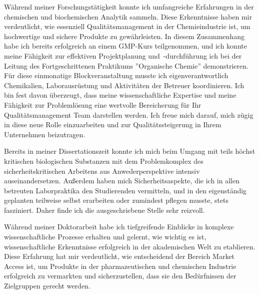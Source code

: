     {Während meiner Forschungstätigkeit konnte ich umfangreiche Erfahrungen in der chemischen und biochemischen Analytik sammeln. Diese Erkenntnisse haben mir verdeutlicht, wie essenziell Qualitätsmanagement in der Chemieindustrie ist, um hochwertige und sichere Produkte zu gewährleisten. In diesem Zusammenhang habe ich bereits erfolgreich an einem GMP-Kurs teilgenommen, und ich konnte meine Fähigkeit zur effektiven Projektplanung \mbox{und -durchführung} ich bei der Leitung des Fortgeschrittenen Praktikums ''Organische Chemie'' demonstrieren. Für diese einmonatige Blockveranstaltung musste ich eigenverantwortlich Chemikalien, Laborausrüstung und Aktivitäten der Betreuer koordinieren. Ich bin fest davon überzeugt, dass meine wissenschaftliche Expertise und meine Fähigkeit zur Problemlösung eine wertvolle Bereicherung für Ihr Qualitätsmanagement Team darstellen werden. Ich freue mich darauf, mich zügig in diese neue Rolle einzuarbeiten und zur Qualitätssteigerung in Ihrem Unternehmen beizutragen.\par }{}
    {Bereits in meiner Dissertationszeit konnte ich mich beim Umgang mit teils höchst kritischen biologischen Substanzen mit dem Problemkomplex des sicherheitskritischen Arbeitens aus Anwederperspektive intensiv auseinandersetzen. Außerdem haben mich Sicherheitsaspekte, die ich in allen betreuten Laborpraktika den Studierenden vermitteln, und in den eigenständig geplanten teilweise selbst erarbeiten oder zumindest pflegen musste, stets fasziniert. Daher finde ich die ausgeschriebene Stelle sehr reizvoll. \par }{}

    {Während meiner Doktorarbeit habe ich tiefgreifende Einblicke in komplexe wissenschaftliche Prozesse erhalten und gelernt, wie wichtig es ist, wissenschaftliche Erkenntnisse erfolgreich in der akademischen Welt zu etablieren. Diese Erfahrung hat mir verdeutlicht, wie entscheidend der Bereich Market Access ist, um Produkte in der pharmazeutischen und chemischen Industrie erfolgreich zu vermarkten und sicherzustellen, dass sie den Bedürfnissen der Zielgruppen gerecht werden.\par}{}



